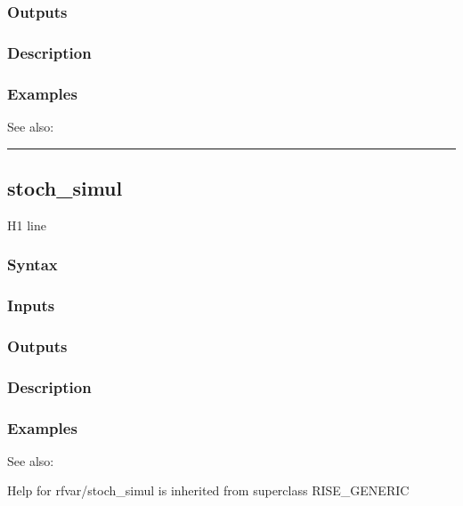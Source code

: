 \documentclass[letterpaper,10pt,english]{sphinxmanual}
\begin{document}
\subsubsection{Outputs}
\label{classes/models/@rfvar/rfvar:id134}

\subsubsection{Description}
\label{classes/models/@rfvar/rfvar:id135}

\subsubsection{Examples}
\label{classes/models/@rfvar/rfvar:id136}
See also:


\bigskip\hrule{}\bigskip



\subsection{stoch\_simul}
\label{classes/models/@rfvar/rfvar:stoch-simul}\label{classes/models/@rfvar/rfvar:id137}
H1 line


\subsubsection{Syntax}
\label{classes/models/@rfvar/rfvar:id138}

\subsubsection{Inputs}
\label{classes/models/@rfvar/rfvar:id139}

\subsubsection{Outputs}
\label{classes/models/@rfvar/rfvar:id140}

\subsubsection{Description}
\label{classes/models/@rfvar/rfvar:id141}

\subsubsection{Examples}
\label{classes/models/@rfvar/rfvar:id142}
See also:

Help for rfvar/stoch\_simul is inherited from superclass RISE\_GENERIC
\end{document}
